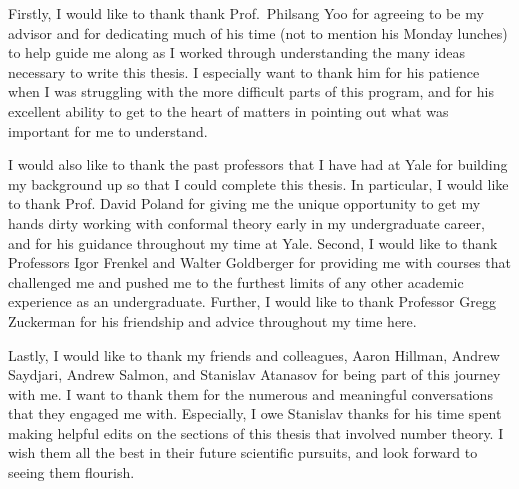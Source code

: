 Firstly, I would like to thank thank Prof.\ Philsang Yoo for agreeing to be my advisor and for dedicating much of his time (not to mention his Monday lunches) to help guide me along as I worked through understanding the many ideas necessary to write this thesis. I especially want to thank him for his patience when I was struggling with the more difficult parts of this program, and for his excellent ability to get to the heart of matters in pointing out what was important for me to understand.

I would also like to thank the past professors that I have had at Yale for building my background up so that I could complete this thesis. In particular, I would like to thank Prof. David Poland for giving me the unique opportunity to get my hands dirty working with conformal theory early in my undergraduate career, and for his guidance throughout my time at Yale. Second, I would like to thank Professors Igor Frenkel and Walter Goldberger for providing me with courses that challenged me and pushed me to the furthest limits of any other academic experience as an undergraduate. Further, I would like to thank Professor Gregg Zuckerman for his friendship and advice throughout my time here.

Lastly, I would like to thank my friends and colleagues, Aaron Hillman, Andrew Saydjari, Andrew Salmon, and Stanislav Atanasov for being part of this journey with me. I want to thank them for the numerous and meaningful conversations that they engaged me with. Especially, I owe Stanislav thanks for his time spent making helpful edits on the sections of this thesis that involved number theory. I wish them all the best in their future scientific pursuits, and look forward to seeing them flourish.